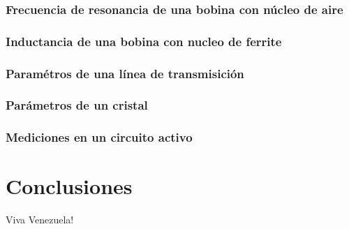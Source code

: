 \documentclass[a4paper,10pt]{article}
\begin{document}
		\subsubsection{Frecuencia de resonancia de una bobina con n\'ucleo de aire}
		\subsubsection{Inductancia de una bobina con nucleo de ferrite}
		\subsubsection{Param\'etros de una l\'inea de transmisici\'on}
		\subsubsection{Par\'ametros de un cristal}	
		\subsubsection{Mediciones en un circuito activo}
			
	\section{Conclusiones}
	\indent Viva Venezuela!\\
\end{document}
